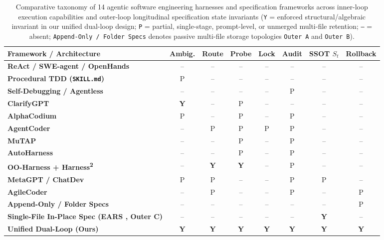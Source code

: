 \documentclass[11pt,a4paper,copyright]{google}
\begin{document}
\begin{table}[t!]
\centering
\caption{Comparative taxonomy of 14 agentic software engineering harnesses and specification frameworks across inner-loop execution capabilities and outer-loop longitudinal specification state invariants (\texttt{Y} = enforced structural/algebraic invariant in our unified dual-loop design; \texttt{P} = partial, single-stage, prompt-level, or unmerged multi-file retention; \texttt{--} = absent; \texttt{Append-Only / Folder Specs} denotes passive multi-file storage topologies \texttt{Outer A} and \texttt{Outer B}).}
\label{tab:baseline_taxonomy}
\footnotesize
\begin{tabularx}{\textwidth}{Y c c c c c c c}
\toprule
\textbf{Framework / Architecture} & \textbf{Ambig.} & \textbf{Route} & \textbf{Probe} & \textbf{Lock} & \textbf{Audit} & \textbf{SSOT $S_t$} & \textbf{Rollback} \\
\midrule
\textbf{ReAct / SWE-agent / OpenHands} \cite{yao2023react,yang2024sweagent,wang2024openhands} & -- & -- & -- & -- & -- & -- & -- \\
\textbf{Procedural TDD (\texttt{SKILL.md})} \cite{skillsbench2026} & P & -- & -- & -- & -- & -- & -- \\
\textbf{Self-Debugging / Agentless} \cite{chen2024selfdebug,xia2024agentless} & -- & -- & -- & -- & P & -- & -- \\
\textbf{ClarifyGPT} \cite{mu2024clarifygpt} & \textbf{Y} & -- & P & -- & -- & -- & -- \\
\textbf{AlphaCodium} \cite{ridnik2024alphacodium} & P & -- & P & -- & P & -- & -- \\
\textbf{AgentCoder} \cite{huang2024agentcoder} & -- & P & P & P & P & -- & -- \\
\textbf{MuTAP} \cite{dakhel2024mutap} & -- & -- & P & -- & P & -- & -- \\
\textbf{AutoHarness} \cite{lou2026autoharness} & -- & -- & P & -- & P & -- & -- \\
\textbf{OO-Harness + Harness\textsuperscript{2}} \cite{li2026ooharness,xu2026harness2} & -- & \textbf{Y} & \textbf{Y} & -- & P & -- & -- \\
\textbf{MetaGPT / ChatDev} \cite{hong2024metagpt,qian2024chatdev} & P & P & -- & -- & P & P & -- \\
\textbf{AgileCoder} \cite{nguyen2025agilecoder} & -- & P & -- & -- & P & -- & P \\
\textbf{Append-Only / Folder Specs} & -- & -- & -- & -- & -- & -- & P \\
\textbf{Single-File In-Place Spec (EARS \cite{mavin2009ears}, Outer C)} & -- & -- & -- & -- & -- & \textbf{Y} & -- \\
\addlinespace[2pt]
\textbf{Unified Dual-Loop (Ours)} & \textbf{Y} & \textbf{Y} & \textbf{Y} & \textbf{Y} & \textbf{Y} & \textbf{Y} & \textbf{Y} \\
\bottomrule
\end{tabularx}
\end{table}
\end{document}
